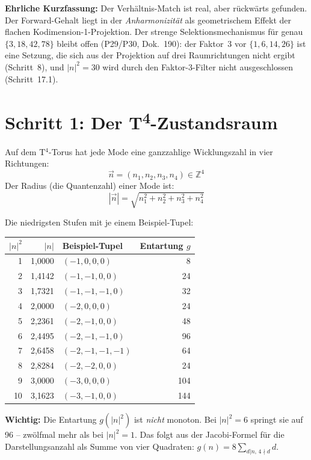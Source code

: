\textbf{Ehrliche Kurzfassung:} Der Verhältnis-Match ist real, aber
rückwärts gefunden. Der Forward-Gehalt liegt in der \emph{Anharmonizität}
als geometrischem Effekt der flachen Kodimension-1-Projektion. Der
strenge Selektionsmechanismus für genau $\{3,18,42,78\}$ bleibt offen
(P29/P30, Dok.~190): der Faktor~3 vor $\{1,6,14,26\}$ ist eine Setzung,
die sich aus der Projektion auf drei Raumrichtungen nicht ergibt (Schritt~8),
und $|n|^2=30$ wird durch den Faktor-3-Filter nicht ausgeschlossen
(Schritt~17.1).

\section{Schritt 1: Der T\textsuperscript{4}-Zustandsraum}

Auf dem T$^4$-Torus hat jede Mode eine ganzzahlige Wicklungszahl in
vier Richtungen:
\[
  \vec{n} = (n_1, n_2, n_3, n_4) \in \mathbb{Z}^4
\]
Der Radius (die Quantenzahl) einer Mode ist:
\[
  |\vec{n}| = \sqrt{n_1^2 + n_2^2 + n_3^2 + n_4^2}
\]

Die niedrigsten Stufen mit je einem Beispiel-Tupel:

\begin{center}
\begin{tabular}{rrlr}
\toprule
$|n|^2$ & $|n|$ & Beispiel-Tupel & Entartung $g$ \\
\midrule
1 & 1{,}0000 & $(-1,0,0,0)$ & 8 \\
2 & 1{,}4142 & $(-1,-1,0,0)$ & 24 \\
3 & 1{,}7321 & $(-1,-1,-1,0)$ & 32 \\
4 & 2{,}0000 & $(-2,0,0,0)$ & 24 \\
5 & 2{,}2361 & $(-2,-1,0,0)$ & 48 \\
6 & 2{,}4495 & $(-2,-1,-1,0)$ & 96 \\
7 & 2{,}6458 & $(-2,-1,-1,-1)$ & 64 \\
8 & 2{,}8284 & $(-2,-2,0,0)$ & 24 \\
9 & 3{,}0000 & $(-3,0,0,0)$ & 104 \\
10 & 3{,}1623 & $(-3,-1,0,0)$ & 144 \\
\bottomrule
\end{tabular}
\end{center}

\textbf{Wichtig:} Die Entartung $g(|n|^2)$ ist \emph{nicht} monoton.
Bei $|n|^2 = 6$ springt sie auf 96 -- zwölfmal mehr als bei $|n|^2 = 1$.
Das folgt aus der Jacobi-Formel für die Darstellungsanzahl als Summe
von vier Quadraten: $g(n) = 8 \sum_{d | n,\, 4\nmid d} d$.

